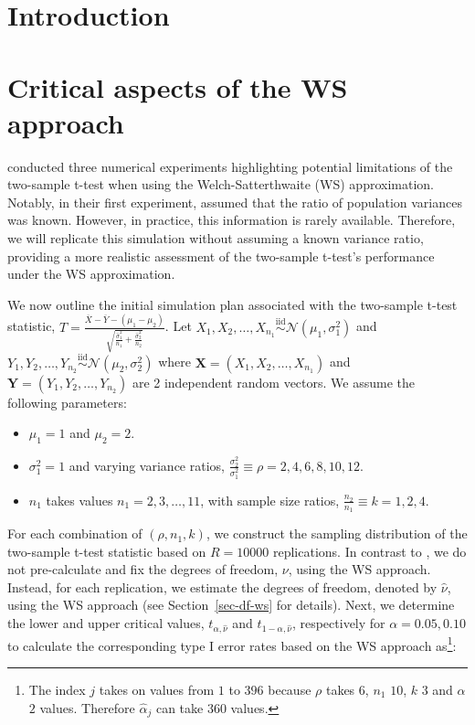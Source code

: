 \documentclass[
  12pt]{article}
\providecommand{\tightlist}{%
  \setlength{\itemsep}{0pt}\setlength{\parskip}{0pt}}\usepackage{longtable,booktabs,array}
\begin{document}
\section{Introduction}\label{sec-intro}

\section{Critical aspects of the WS
approach}\label{critical-aspects-of-the-ws-approach}

\citet{lloyd_2-sample_2013} conducted three numerical experiments
highlighting potential limitations of the two-sample t-test when using
the Welch-Satterthwaite (WS) approximation. Notably, in their first
experiment, \citet{lloyd_2-sample_2013} assumed that the ratio of
population variances was known. However, in practice, this information
is rarely available. Therefore, we will replicate this simulation
without assuming a known variance ratio, providing a more realistic
assessment of the two-sample t-test's performance under the WS
approximation.

We now outline the initial simulation plan associated with the
two-sample t-test statistic,
\(T = \frac{\overline{X} - \overline{Y} - (\mu_1 - \mu_2)}{\sqrt{\frac{\widehat{\sigma}^2_1}{n_1} + \frac{\widehat{\sigma}^2_2}{n_2}}}\).
Let
\(X_1, X_2, \ldots, X_{n_1} \overset{\text{iid}}{\sim} \mathcal{N}(\mu_1, \sigma_1^2)\)
and
\(Y_1, Y_2, \ldots, Y_{n_2} \overset{\text{iid}}{\sim} \mathcal{N}(\mu_2, \sigma_2^2)\)
where \(\mathbf{X} = (X_1, X_2, \ldots, X_{n_1})\) and
\(\mathbf{Y} = (Y_1, Y_2, \ldots, Y_{n_2})\) are 2 independent random
vectors. We assume the following parameters:

\begin{itemize}
\tightlist
\item
  \(\mu_1 = 1\) and \(\mu_2 = 2\).
\item
  \(\sigma^2_1 = 1\) and varying variance ratios,
  \(\frac{\sigma^2_2}{\sigma^2_1} \equiv \rho = 2, 4, 6, 8, 10, 12\).
\item
  \(n_1\) takes values \(n_1 = 2, 3, \ldots, 11\), with sample size
  ratios, \(\frac{n_2}{n_1} \equiv k = 1, 2, 4\).
\end{itemize}

For each combination of \((\rho, n_1, k)\), we construct the sampling
distribution of the two-sample t-test statistic based on \(R = 10000\)
replications. In contrast to \citet{lloyd_2-sample_2013}, we do not
pre-calculate and fix the degrees of freedom, \(\nu\), using the WS
approach. Instead, for each replication, we estimate the degrees of
freedom, denoted by \(\widehat{\nu}\), using the WS approach (see
Section~\ref{sec-df-ws} for details). Next, we determine the lower and
upper critical values, \(t_{\alpha,\widehat{\nu}}\) and
\(t_{1-\alpha,\widehat{\nu}}\), respectively for \(\alpha = 0.05, 0.10\)
to calculate the corresponding type I error rates based on the WS
approach as\footnote{The index \(j\) takes on values from \(1\) to
  \(396\) because \(\rho\) takes \(6\), \(n_1\) \(10\), \(k\) \(3\) and
  \(\alpha\) \(2\) values. Therefore \(\widehat{\alpha}_j\) can take
  \(360\) values.}:
\end{document}
